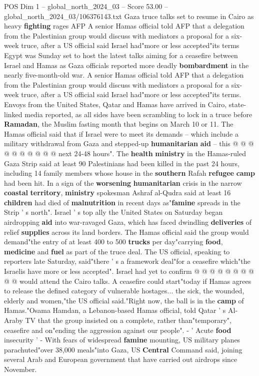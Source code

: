 \begin{textsample}{POS Dim 1 – global\_north\_2024\_03 – Score 53.00 – global\_north\_2024\_03/106376143.txt}  \label{ex:f1_pos_051}
Gaza truce talks set to resume in Cairo as heavy \textbf{fighting} rages AFP A senior Hamas official told AFP that a delegation from the Palestinian group would discuss with mediators a proposal for a six-week truce, after a US official said Israel had"more or less accepted"its terms Egypt was Sunday set to host the latest talks aiming for a ceasefire between Israel and Hamas as Gaza officials reported more deadly \textbf{bombardment} in the nearly five-month-old war.
A senior Hamas official told AFP that a delegation from the Palestinian group would discuss with mediators a proposal for a six-week truce, after a US official said Israel had"more or less accepted"its terms.
Envoys from the United States, Qatar and Hamas have arrived in Cairo, state-linked media reported, as all sides have been scrambling to lock in a truce before \textbf{Ramadan}, the Muslim fasting month that begins on March 10 or 11.
The Hamas official said that if Israel were to meet its demands -- which include a military withdrawal from Gaza and stepped-up \textbf{humanitarian} \textbf{aid} -- this @ @ @ @ @ @ @ @ @ @ next 24-48 hours".
The \textbf{health} \textbf{ministry} in the Hamas-ruled Gaza Strip said at least 90 Palestinians had been killed in the past 24 hours, including 14 family members whose house in the \textbf{southern} Rafah \textbf{refugee} \textbf{camp} had been hit.
In a sign of the \textbf{worsening} \textbf{humanitarian} crisis in the narrow \textbf{coastal} \textbf{territory}, \textbf{ministry} spokesman Ashraf al-Qudra said at least 16 \textbf{children} had died of \textbf{malnutrition} in recent days as"\textbf{famine} spreads in the Strip ' s north".
Israel ' s top ally the United States on Saturday began airdropping \textbf{aid} into war-ravaged Gaza, which has faced dwindling \textbf{deliveries} of relief \textbf{supplies} across its land borders.
The Hamas official said the group would demand"the entry of at least 400 to 500 \textbf{trucks} per day"carrying \textbf{food}, \textbf{medicine} and \textbf{fuel} as part of the truce deal.
The US official, speaking to reporters late Saturday, said"there ' s a framework deal"for a ceasefire which"the Israelis have more or less accepted".
Israel had yet to confirm @ @ @ @ @ @ @ @ @ @ would attend the Cairo talks.
A ceasefire could start"today if Hamas agrees to release the defined category of vulnerable hostages... the sick, the wounded, elderly and women,"the US official said."Right now, the ball is in the \textbf{camp} of Hamas."Osama Hamdan, a Lebanon-based Hamas official, told Qatar ' s Al-Araby TV that the group insisted on a complete, rather than"temporary", ceasefire and on"ending the aggression against our people". - ' Acute \textbf{food} insecurity ' - With fears of widespread \textbf{famine} mounting, US military planes parachuted"over 38,000 meals"into Gaza, US \textbf{Central} Command said, joining several Arab and European government that have carried out airdrops since November.

\end{textsample}
